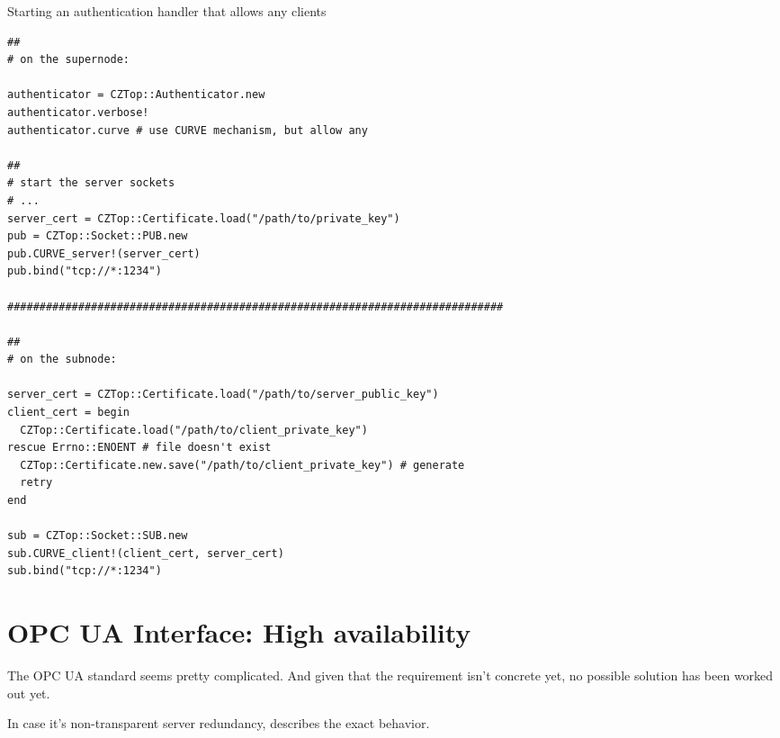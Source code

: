 \begin{listing}
	\caption{Starting an authentication handler that allows any clients}
	\label{lst:auth:any}
	\begin{verbatim}
##
# on the supernode:

authenticator = CZTop::Authenticator.new
authenticator.verbose!
authenticator.curve # use CURVE mechanism, but allow any

##
# start the server sockets
# ...
server_cert = CZTop::Certificate.load("/path/to/private_key")
pub = CZTop::Socket::PUB.new
pub.CURVE_server!(server_cert)
pub.bind("tcp://*:1234")

#############################################################################

##
# on the subnode:

server_cert = CZTop::Certificate.load("/path/to/server_public_key")
client_cert = begin
  CZTop::Certificate.load("/path/to/client_private_key")
rescue Errno::ENOENT # file doesn't exist
  CZTop::Certificate.new.save("/path/to/client_private_key") # generate
  retry
end

sub = CZTop::Socket::SUB.new
sub.CURVE_client!(client_cert, server_cert)
sub.bind("tcp://*:1234")
	\end{verbatim}
\end{listing}

\section{OPC UA Interface: High availability}\label{sec:approach:opc-ua}
The OPC UA standard seems pretty complicated. And given that the requirement
isn't concrete yet, no possible solution has been worked out yet.

In case it's non-transparent server redundancy, \cite[6.4.2.4 Non-transparent
Redundancy, p.~96]{opc-ua:behavior:server-redundancy} describes the exact
behavior.

